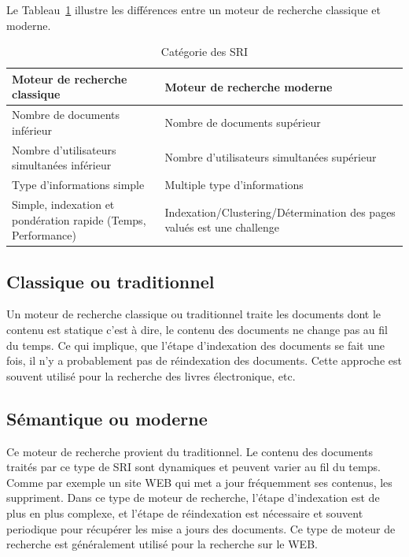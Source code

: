 Le Tableau~\ref{tab:categorie-sri} illustre les différences entre un moteur de recherche classique et moderne.

\begin{table}[htbp]
	\centering
    \renewcommand{\arraystretch}{1.5} %
    \begin{tabularx}{\textwidth}{|X|X|}
		\hline
		\textbf{Moteur de recherche classique} & \textbf{Moteur de recherche moderne} \\ 
		\hline
		Nombre de documents inférieur & Nombre de documents supérieur \\
		\hline
		Nombre d'utilisateurs simultanées inférieur & Nombre d'utilisateurs simultanées supérieur \\
		\hline
		Type d’informations simple & Multiple type d'informations \\
		\hline
		Simple, indexation et pondération rapide (Temps, Performance) & Indexation/Clustering/Détermination des pages valués est une challenge \\
		\hline
	\end{tabularx}
	\caption{Catégorie des SRI \citep{ir-on-web}}\label{tab:categorie-sri}
\end{table}

\subsection{Classique ou traditionnel}
Un moteur de recherche classique ou traditionnel traite les documents dont le contenu est statique c'est à dire, le contenu des documents ne change pas au fil du temps. Ce qui implique, que l'étape d'indexation des documents se fait une fois, il n'y a probablement pas de réindexation des documents. Cette approche est souvent utilisé pour la recherche des livres électronique, etc.

\subsection{Sémantique ou moderne}
Ce moteur de recherche provient du traditionnel. Le contenu des documents traités par ce type de SRI sont dynamiques et peuvent varier au fil du temps. Comme par exemple un site WEB qui met a jour fréquemment ses contenus, les suppriment. Dans ce type de moteur de recherche, l'étape d'indexation est de plus en plus complexe, et l'étape de réindexation est nécessaire et souvent periodique pour récupérer les mise a jours des documents. Ce type de moteur de recherche est généralement utilisé pour la recherche sur le WEB\@.

